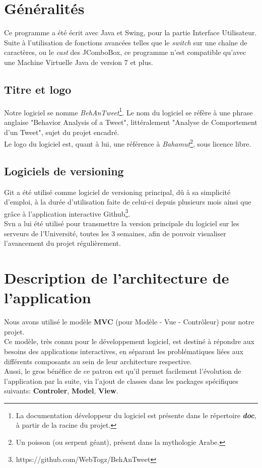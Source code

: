 \documentclass[pdftex,12pt,a4paper]{report}
\begin{document}
\begin{spacing}{1.2}
\section{Généralités}

Ce programme a été écrit avec Java et Swing, pour la partie Interface Utilisateur.
\\
Suite à l'utilisation de fonctions avancées telles que le \textit{switch} sur une chaîne de caractères, ou le \textit{cast} des JComboBox, ce programme n'est compatible qu'avec une Machine Virtuelle Java de version 7 et plus.

\subsection{Titre et logo}

Notre logiciel se nomme \textit{BehAnTweet}\footnote{La documentation développeur du logiciel est présente dans le répertoire \textit{\textbf{doc}}, à partir de la racine du projet.}. Le nom du logiciel se réfère à une phrase anglaise "Behavior Analysis of a Tweet", littéralement "Analyse de Comportement d'un Tweet", sujet du projet encadré.
\\
Le logo du logiciel est, quant à lui, une référence à \textit{Bahamut}\footnote{Un poisson (ou serpent géant), présent dans la mythologie Arabe.}, sous licence libre.

\subsection{Logiciels de versioning}

Git a été utilisé comme logiciel de versioning principal, dû à sa simplicité d'emploi, à la durée d'utilisation faite de celui-ci depuis plusieurs mois ainsi que grâce à l'application interactive Github\footnote{https://github.com/WebTogz/BehAnTweet}.\\
Svn a lui été utilisé pour transmettre la version principale du logiciel sur les serveurs de l'Université, toutes les 3 semaines, afin de pouvoir visualiser l'avancement du projet régulièrement.

\section{Description de l'architecture de l'application}

Nous avons utilisé le modèle \textbf{MVC} (pour Modèle - Vue - Contrôleur) pour notre projet.\\
Ce modèle, très connu pour le développement logiciel, est destiné à répondre aux besoins des applications interactives, en séparant les problématiques liées aux différents composants au sein de leur architecture respective.\\
Aussi, le gros bénéfice de ce patron est qu'il permet facilement l'évolution de l'application par la suite, via l'ajout de classes dans les packages spécifiques suivants: \textbf{Controler}, \textbf{Model}, \textbf{View}.


\end{spacing}
\end{document}
